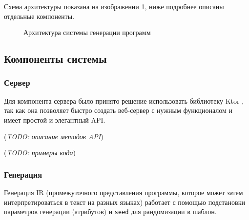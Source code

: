 Схема архитектуры показана на изображении \ref{architecture}, ниже подробнее описаны отдельные
компоненты.

\begin{figure}[ht]
    \begin{center}
        \caption{\label{architecture} Архитектура системы генерации программ}
    \end{center}
\end{figure}
\clearpage



\subsection{Компоненты системы}
\subsubsection{Сервер}
Для компонента сервера было принято решение использовать библиотеку Ktor \cite{ktor}, так как
она позволяет быстро создать веб-сервер с нужным функционалом и имеет простой и элегантный API.

(\textit{TODO: описание методов API})

(\textit{TODO: примеры кода})

\subsubsection{Генерация}
Генерация IR (промежуточного представления программы, которое может затем
интерпретироваться в текст на разных языках) работает с помощью подстановки
параметров генерации (атрибутов) и \texttt{seed} для рандомизации в шаблон.

